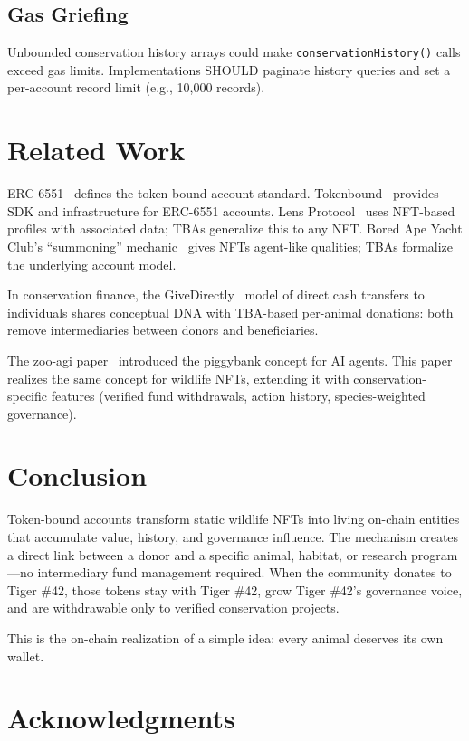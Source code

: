 \documentclass[11pt,letterpaper]{article}
\begin{document}
\subsection{Gas Griefing}

Unbounded conservation history arrays could make \texttt{conservationHistory()} calls exceed gas limits. Implementations SHOULD paginate history queries and set a per-account record limit (e.g., 10,000 records).

\section{Related Work}

ERC-6551~\cite{erc6551} defines the token-bound account standard. Tokenbound~\cite{tokenbound2023} provides SDK and infrastructure for ERC-6551 accounts. Lens Protocol~\cite{lens2022} uses NFT-based profiles with associated data; TBAs generalize this to any NFT. Bored Ape Yacht Club's ``summoning'' mechanic~\cite{bayc2022} gives NFTs agent-like qualities; TBAs formalize the underlying account model.

In conservation finance, the GiveDirectly~\cite{givedirectly2020} model of direct cash transfers to individuals shares conceptual DNA with TBA-based per-animal donations: both remove intermediaries between donors and beneficiaries.

The zoo-agi paper~\cite{zooagi2024} introduced the piggybank concept for AI agents. This paper realizes the same concept for wildlife NFTs, extending it with conservation-specific features (verified fund withdrawals, action history, species-weighted governance).

\section{Conclusion}

Token-bound accounts transform static wildlife NFTs into living on-chain entities that accumulate value, history, and governance influence. The mechanism creates a direct link between a donor and a specific animal, habitat, or research program---no intermediary fund management required. When the community donates to Tiger \#42, those tokens stay with Tiger \#42, grow Tiger \#42's governance voice, and are withdrawable only to verified conservation projects.

This is the on-chain realization of a simple idea: every animal deserves its own wallet.

\section*{Acknowledgments}
\end{document}

